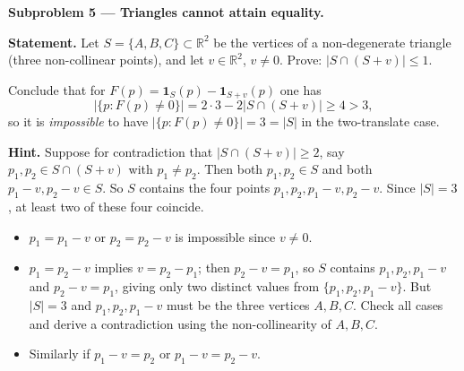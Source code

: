 \documentclass{article}
\begin{document}
\textbf{Subproblem 5 --- Triangles cannot attain equality.}

\medskip
\textbf{Statement.}
Let $S = \{A, B, C\}\subset\mathbb{R}^2$ be the vertices of a non-degenerate triangle (three non-collinear points), and let $v\in\mathbb{R}^2$, $v\neq 0$.
Prove: $|S\cap(S+v)|\le 1$.

Conclude that for $F(p) = \mathbf{1}_S(p) - \mathbf{1}_{S+v}(p)$ one has
\[
  |\{p : F(p)\neq 0\}| = 2\cdot 3 - 2|S\cap(S+v)| \ge 4 > 3,
\]
so it is \emph{impossible} to have $|\{p:F(p)\neq 0\}|=3=|S|$ in the two-translate case.

\medskip
\textbf{Hint.}
Suppose for contradiction that $|S\cap(S+v)|\ge 2$, say $p_1,p_2\in S\cap(S+v)$ with $p_1\neq p_2$.
Then both $p_1,p_2\in S$ and both $p_1-v,p_2-v\in S$.  So $S$ contains the four points $p_1,p_2,p_1-v,p_2-v$.  Since $|S|=3$, at least two of these four coincide.
\begin{itemize}
  \item $p_1 = p_1 - v$ or $p_2 = p_2-v$ is impossible since $v\neq 0$.
  \item $p_1 = p_2-v$ implies $v = p_2-p_1$; then $p_2-v = p_1$, so $S$ contains $p_1,p_2,p_1-v$ and $p_2-v = p_1$, giving only two distinct values from $\{p_1,p_2,p_1-v\}$.  But $|S|=3$ and $p_1,p_2,p_1-v$ must be the three vertices $A,B,C$.  Check all cases and derive a contradiction using the non-collinearity of $A,B,C$.
  \item Similarly if $p_1-v = p_2$ or $p_1-v=p_2-v$.
\end{itemize}
\end{document}
